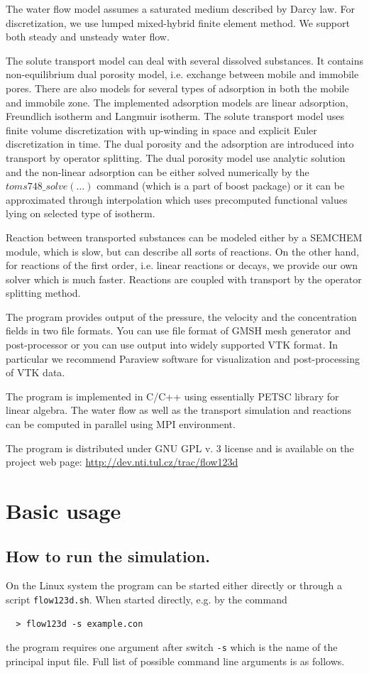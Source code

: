 \documentclass[12pt,a4paper]{report}
\begin{document}
The water flow model assumes a saturated medium described by Darcy law. For discretization, we use lumped mixed-hybrid finite element method.
We support both steady and unsteady water flow.

The solute transport model can deal with several dissolved substances. It contains non-equilibrium dual porosity model, 
i.e. exchange between mobile and immobile 
pores. There are also models for several types of adsorption in both the mobile and immobile zone. The implemented adsorption models are
linear adsorption, Freundlich isotherm and Langmuir isotherm. The solute transport model uses finite volume discretization 
with up-winding in space and explicit Euler discretization in time. The dual porosity and the adsorption are introduced into transport by operator splitting.
The dual porosity model use analytic solution and the non-linear adsorption can be either solved numerically by the $toms748\_solve(...)$ 
command (which is a part of boost package) or it can be approximated through interpolation which uses precomputed functional values lying on selected type of isotherm.

Reaction between transported substances can be modeled either by a SEMCHEM module, which is slow, but can describe all sorts of reactions. On the other hand,
for reactions of the first order, i.e. linear reactions or decays, we provide our own solver which is much faster. Reactions are coupled with transport 
by the operator splitting method.

The program provides output of the pressure, the velocity and the concentration fields in two file formats. You can use file format of GMSH mesh generator and post-processor 
or you can use output into widely supported VTK format. In particular we recommend Paraview software for visualization and post-processing of VTK data.

The program is implemented in C/C++ using essentially PETSC library for linear algebra. The water flow as well as the transport simulation and reactions can be computed 
in parallel using MPI environment. 

The program is distributed under GNU GPL v. 3 license and is available on the project web page:
\url{http://dev.nti.tul.cz/trac/flow123d}

\section{Basic usage}

\subsection{How to run the simulation.}
On the Linux system the program can be started either directly or through a script \verb'flow123d.sh'. When started directly, e.g. by the command
\begin{verbatim}
  > flow123d -s example.con
\end{verbatim}
the program requires one argument after switch \verb'-s' which is the name of the principal input file. Full list of possible command line arguments is as follows.
\end{document}
